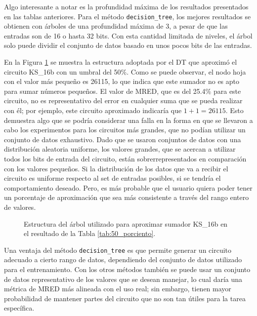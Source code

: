 Algo interesante a notar es la profundidad máxima de los resultados presentados
en las tablas anteriores. Para el método \texttt{decision\_tree}, los mejores
resultados se obtienen con árboles de una profundidad máxima de 3, a pesar de
que las entradas son de 16 o hasta 32 bits. Con esta cantidad limitada de
niveles, el árbol solo puede dividir el conjunto de datos basado en unos pocos
bits de las entradas.

En la Figura \ref{fig:KS_16b_50} se muestra la estructura adoptada por el DT
que aproximó el circuito KS\_16b con un umbral del \num{50}\%. Como se puede
observar, el nodo hoja con el valor más pequeño es \num{26115}, lo que indica
que este sumador no es apto para sumar números pequeños. El valor de MRED, que
es del \num{25.4}\% para este circuito, no es representativo del error en
cualquier suma que se pueda realizar con él; por ejemplo, este circuito
aproximado indicaría que $1+1=26115$. Esto demuestra algo que se podría
considerar una  falla en la forma en que se llevaron a cabo los experimentos
para los circuitos más grandes, que no podían utilizar un conjunto de datos
exhaustivo. Dado que se usaron conjuntos de datos con una distribución
aleatoria uniforme, los valores grandes, que se acercan a utilizar todos los
bits de entrada del circuito, están sobrerrepresentados en comparación con los
valores pequeños. Si la distribución de los datos que va a recibir el circuito
es uniforme respecto al set de entradas posibles, si se tendría el
comportamiento deseado. Pero, es más probable que el usuario quiera poder tener
un porcentaje de aproximación que sea más consistente a través del rango entero
de valores.

\begin{figure}[htb]
  \centering
  
  \caption{Estructura del árbol utilizado para aproximar sumador KS\_16b en el resultado de la Tabla \ref{tab:50_porciento}.}
  \label{fig:KS_16b_50}
\end{figure}

Una ventaja del método \texttt{decision\_tree} es que permite generar un
circuito adecuado a cierto rango de datos, dependiendo del conjunto de datos
utilizado para el entrenamiento. Con los otros métodos también se puede usar un
conjunto de datos representativo de los valores que se desean manejar, lo cual
daría una métrica de MRED más alineada con el uso real; sin embargo, tienen
mayor probabilidad de mantener partes del circuito que no son tan útiles para
la tarea específica.

